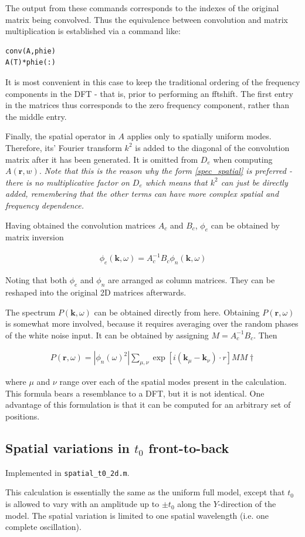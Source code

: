 \documentclass[10pt,a4paper]{article}
\begin{document}
The output from these commands corresponds to the indexes of the original matrix being convolved. Thus the equivalence between convolution and matrix multiplication is established via a command like:

\begin{lstlisting}[style=Matlab-editor,basicstyle=\mlttfamily]
conv(A,phie)
A(T)*phie(:)
\end{lstlisting}

It is most convenient in this case to keep the traditional ordering of the frequency components in the DFT - that is, prior to performing an fftshift. The first entry in the matrices thus corresponds to the zero frequency component, rather than the middle entry.

Finally, the spatial operator in $A$ applies only to spatially uniform modes. Therefore, its' Fourier transform $k^2$ is added to the diagonal of the convolution matrix after it has been generated. It is omitted from $D_e$ when computing $A(\mathbf{r},w)$. \emph{Note that this is the reason why the form \eqref{spec_spatial} is preferred - there is no multiplicative factor on $D_e$ which means that $k^2$ can just be directly added, remembering that the other terms can have more complex spatial and frequency dependence.}

Having obtained the convolution matrices $A_c$ and $B_c$, $\phi_e$ can be obtained by matrix inversion

\begin{align}
\phi_e(\mathbf{k},\omega) = A_c^{-1}B_c\phi_n(\mathbf{k},\omega)
\end{align}

Noting that both $\phi_e$ and $\phi_n$ are arranged as column matrices. They can be reshaped into the original 2D matrices afterwards. 

The spectrum $P(\mathbf{k},\omega)$ can be obtained directly from here. Obtaining $P(\mathbf{r},\omega)$ is somewhat more involved, because it requires averaging over the random phases of the white noise input. It can be obtained by assigning $M = A_c^{-1}B_c$. Then

\begin{align}
P(\mathbf{r},\omega) = |\phi_n(\omega)^2| \sum_{\mu,\nu} \exp[i(\mathbf{k}_\mu - \mathbf{k}_\nu) \cdot r] MM\dag
\end{align}

where $\mu$ and $\nu$ range over each of the spatial modes present in the calculation. This formula bears a resemblance to a DFT, but it is not identical. One advantage of this formulation is that it can be computed for an arbitrary set of positions. 


\subsection{Spatial variations in  $t_0$ front-to-back}
Implemented in {\tt spatial\_t0\_2d.m}.

This calculation is essentially the same as the uniform full model, except that $t_0$ is allowed to vary with an amplitude up to $\pm t_0$ along the $Y$-direction of the model. The spatial variation is limited to one spatial wavelength (i.e. one complete oscillation).
\end{document}
